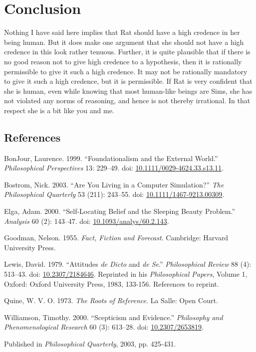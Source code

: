 \documentclass[
  10pt,
  letterpaper,
  DIV=11,
  numbers=noendperiod,
  twoside]{scrartcl}
\newlength{\cslhangindent}
\newenvironment{CSLReferences}[2] %
 {\begin{list}{}{%
  \setlength{\itemindent}{0pt}
  \setlength{\leftmargin}{0pt}
  \setlength{\parsep}{0pt}
  \ifodd #1
   \setlength{\leftmargin}{\cslhangindent}
   \setlength{\itemindent}{-1\cslhangindent}
  \fi
  \setlength{\itemsep}{#2\baselineskip}}}
 {\end{list}}
\begin{document}
\section{Conclusion}\label{conclusion}

Nothing I have said here implies that Rat should have a high credence in
her being human. But it does make one argument that she should not have
a high credence in this look rather tenuous. Further, it is quite
plausible that if there is no good reason not to give high credence to a
hypothesis, then it is rationally permissible to give it such a high
credence. It may not be rationally mandatory to give it such a high
credence, but it is permissible. If Rat is very confident that she is
human, even while knowing that most human-like beings are Sims, she has
not violated any norms of reasoning, and hence is not thereby
irrational. In that respect she is a bit like you and me.

\subsection*{References}\label{references}

\label{refs}
\begin{CSLReferences}{1}{0}
BonJour, Laurence. 1999. {``Foundationalism and the External World.''}
\emph{Philosophical Perspectives} 13: 229--49. doi:
\href{https://doi.org/10.1111/0029-4624.33.s13.11}{10.1111/0029-4624.33.s13.11}.

Bostrom, Nick. 2003. {``Are You Living in a Computer Simulation?''}
\emph{The Philosophical Quarterly} 53 (211): 243--55. doi:
\href{https://doi.org/10.1111/1467-9213.00309}{10.1111/1467-9213.00309}.

Elga, Adam. 2000. {``Self-Locating Belief and the Sleeping Beauty
Problem.''} \emph{Analysis} 60 (2): 143--47. doi:
\href{https://doi.org/10.1093/analys/60.2.143}{10.1093/analys/60.2.143}.

Goodman, Nelson. 1955. \emph{Fact, Fiction and Forecast}. Cambridge:
Harvard University Press.

Lewis, David. 1979. {``Attitudes \emph{de Dicto} and \emph{de Se}.''}
\emph{Philosophical Review} 88 (4): 513--43. doi:
\href{https://doi.org/10.2307/2184646}{10.2307/2184646}. Reprinted in
his \emph{Philosophical Papers}, Volume 1, Oxford: Oxford University
Press, 1983, 133-156. References to reprint.

Quine, W. V. O. 1973. \emph{The Roots of Reference}. La Salle: Open
Court.

Williamson, Timothy. 2000. {``{Scepticism and Evidence}.''}
\emph{Philosophy and Phenomenological Research} 60 (3): 613--28. doi:
\href{https://doi.org/10.2307/2653819}{10.2307/2653819}.

\end{CSLReferences}



\noindent Published in\emph{
Philosophical Quarterly}, 2003, pp. 425-431.
\end{document}
